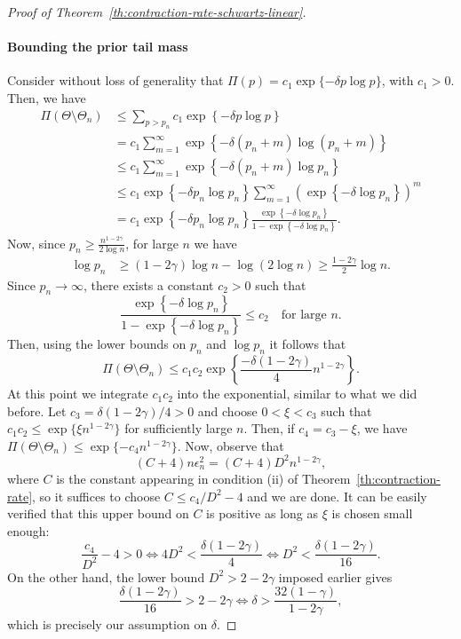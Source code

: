 \begin{proof}[Proof of Theorem~\ref{th:contraction-rate-schwartz-linear}]
\paragraph{Bounding the prior tail mass} Consider without loss of generality that \(\Pi(p)=c_1\exp\{-\delta p \log p\}\), with \(c_1>0\). Then, we have
\begin{align*}
  \Pi(\Theta \setminus \Theta_n) & \leq \sum_{p>p_n} c_1\exp\left\{-\delta p \log p\right\}                                                        \\
  & = c_1\sum_{m=1}^\infty \exp\left\{-\delta (p_n+m) \log(p_n+m)\right\}                                           \\
  & \leq c_1\sum_{m=1}^\infty  \exp\left\{-\delta(p_n+m)\log p_n\right\}                                            \\
  & \leq c_1\exp\left\{-\delta p_n \log p_n\right\} \sum_{m=1}^\infty \left(\exp\left\{-\delta \log p_n\right\}\right)^m       \\
  & = c_1\exp\left\{-\delta p_n \log p_n\right\} \frac{\exp\left\{-\delta \log p_n\right\}}{1-\exp\left\{-\delta \log p_n\right\}}.
\end{align*}
Now, since \(p_n\geq \frac{n^{1-2\gamma}}{2\log n}\), for large \(n\) we have
\begin{align*}
  \log p_n & \geq (1-2\gamma)\log n - \log (2\log n) \geq \frac{1-2\gamma}{2}\log n.
\end{align*}
Since \(p_n\to\infty\), there exists a constant \(c_2>0\) such that
\[
  \frac{\exp\left\{-\delta \log p_n\right\}}{1-\exp\left\{-\delta \log p_n\right\}}\leq c_2\quad \text{for large } n.
\]
Then, using the lower bounds on \(p_n\) and \(\log p_n\) it follows that
\[
  \Pi(\Theta \setminus \Theta_n) \leq c_1c_2 \exp\left\{\frac{-\delta (1-2\gamma)}{4}n^{1-2\gamma}\right\}.
\]
At this point we integrate \(c_1c_2\) into the exponential, similar to what we did before. Let \(c_3=\delta(1-2\gamma)/4>0\) and choose \(0<\xi<c_3\) such that \(c_1c_2\leq \exp\{\xi n^{1-2\gamma}\}\) for sufficiently large \(n\). Then, if \(c_4=c_3-\xi\), we have \(\Pi(\Theta \setminus \Theta_n) \leq \exp\{-c_4n^{1-2\gamma}\}\). Now, observe that 
\[
  (C+4)n\epsilon_n^2=(C+4)D^2n^{1-2\gamma},
\]
where \(C\) is the constant appearing in condition (ii) of Theorem~\ref{th:contraction-rate}, so it suffices to choose \(C\leq c_4/D^2 -4\) and we are done. It can be easily verified that this upper bound on \(C\) is positive as long as \(\xi\) is chosen small enough:
\[
\frac{c_4}{D^2} - 4 > 0 \iff 4D^2 < \frac{\delta(1-2\gamma)}{4} \iff D^2 < \frac{\delta(1-2\gamma)}{16}.
\]
On the other hand, the lower bound \(D^2>2-2\gamma\) imposed earlier gives
\[
\frac{\delta(1-2\gamma)}{16} > 2-2\gamma \iff \delta > \frac{32(1-\gamma)}{1-2\gamma},
\]
which is precisely our assumption on \(\delta\).


\end{proof}
